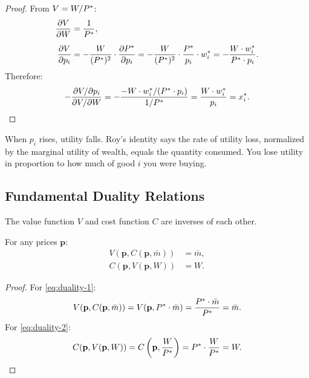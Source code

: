 \begin{proof}
From $V = W / P^{*}$:
\begin{align}
\frac{\partial V}{\partial W} &= \frac{1}{P^{*}}, \\[6pt]
\frac{\partial V}{\partial p_i} &= -\frac{W}{(P^{*})^2} \cdot \frac{\partial P^{*}}{\partial p_i} = -\frac{W}{(P^{*})^2} \cdot \frac{P^{*}}{p_i} \cdot w_i^* = -\frac{W \cdot w_i^*}{P^{*} \cdot p_i}.
\end{align}
Therefore:
\[
-\frac{\partial V / \partial p_i}{\partial V / \partial W} = -\frac{-W \cdot w_i^* / (P^{*} \cdot p_i)}{1/P^{*}} = \frac{W \cdot w_i^*}{p_i} = x_i^*. \qedhere
\]
\end{proof}

\begin{calloutnote}
When $p_i$ rises, utility falls. Roy's identity says the rate of utility loss, normalized by the marginal utility of wealth, equals the quantity consumed. You lose utility in proportion to how much of good $i$ you were buying.
\end{calloutnote}

\subsection{Fundamental Duality Relations}
\label{subsec:duality-relations}

The value function $V$ and cost function $C$ are inverses of each other.

\begin{proposition}[Duality]
\label{prop:duality}
For any prices $\mathbf{p}$:
\begin{align}
V(\mathbf{p}, C(\mathbf{p}, \bar{m})) &= \bar{m}, \label{eq:duality-1} \\[4pt]
C(\mathbf{p}, V(\mathbf{p}, W)) &= W. \label{eq:duality-2}
\end{align}
\end{proposition}

\begin{proof}
For \cref{eq:duality-1}:
\[
V(\mathbf{p}, C(\mathbf{p}, \bar{m})) = V(\mathbf{p}, P^{*} \cdot \bar{m}) = \frac{P^{*} \cdot \bar{m}}{P^{*}} = \bar{m}.
\]
For \cref{eq:duality-2}:
\[
C(\mathbf{p}, V(\mathbf{p}, W)) = C\left(\mathbf{p}, \frac{W}{P^{*}}\right) = P^{*} \cdot \frac{W}{P^{*}} = W. \qedhere
\]
\end{proof}

